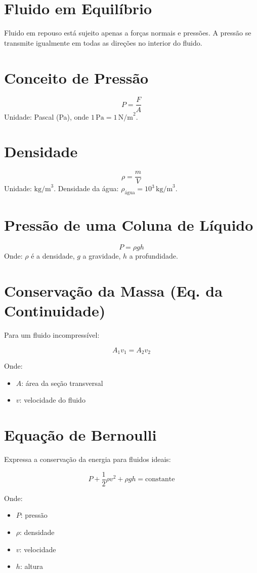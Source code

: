 \documentclass[a4paper,12pt]{article}
\begin{document}
\begin{multicols}{2}
\section{Fluido em Equilíbrio}
Fluido em repouso está sujeito apenas a forças normais e pressões. A pressão se transmite igualmente em todas as direções no interior do fluido.

\section{Conceito de Pressão}
\[
P = \frac{F}{A}
\]
Unidade: Pascal (Pa), onde \(1\, \text{Pa} = 1\, \text{N/m}^2\).

\section{Densidade}
\[
\rho = \frac{m}{V}
\]
Unidade: \(\text{kg/m}^3\). Densidade da água: \(\rho_{\text{água}} = 10^3\, \text{kg/m}^3\).

\section{Pressão de uma Coluna de Líquido}
\[
P = \rho g h
\]
Onde: \(\rho\) é a densidade, \(g\) a gravidade, \(h\) a profundidade.

\section{Conservação da Massa (Eq. da Continuidade)}

Para um fluido incompressível:

\[
A_1 v_1 = A_2 v_2
\]

Onde:
\begin{itemize}
  \item \( A \): área da seção transversal
  \item \( v \): velocidade do fluido
\end{itemize}

\section{Equação de Bernoulli}

Expressa a conservação da energia para fluidos ideais:

\[
P + \frac{1}{2} \rho v^2 + \rho g h = \text{constante}
\]

Onde:
\begin{itemize}
  \item \( P \): pressão
  \item \( \rho \): densidade
  \item \( v \): velocidade
  \item \( h \): altura
\end{itemize}


\end{multicols}
\end{document}
